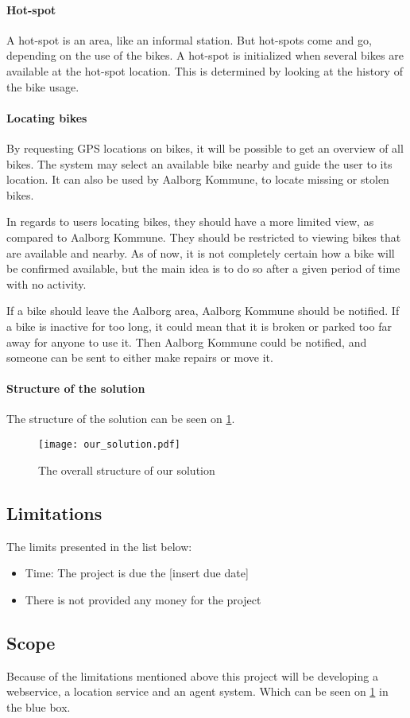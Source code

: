 \paragraph{Hot-spot}
A hot-spot is an area, like an informal station.
But hot-spots come and go, depending on the use of the bikes.
A hot-spot is initialized when several bikes are available at the hot-spot location.
This is determined by looking at the history of the bike usage.

\paragraph{Locating bikes}
By requesting GPS locations on bikes, it will be possible to get an overview of all bikes.
The system may select an available bike nearby and guide the user to its location.
It can also be used by Aalborg Kommune, to locate missing or stolen bikes.

In regards to users locating bikes, they should have a more limited view, as compared to Aalborg Kommune.
They should be restricted to viewing bikes that are available and nearby.
As of now, it is not completely certain how a bike will be confirmed available, but the main idea is to do so after a given period of time with no activity.

If a bike should leave the Aalborg area, Aalborg Kommune should be notified.
If a bike is inactive for too long, it could mean that it is broken or parked too far away for anyone to use it.
Then Aalborg Kommune could be notified, and someone can be sent to either make repairs or move it.

\paragraph{Structure of the solution}
The structure of the solution can be seen on \cref{fig:solution_structure}.

\begin{figure}
\texttt{[image: our\_solution.pdf]}
\caption{The overall structure of our solution}
\label{fig:solution_structure}
\end{figure}

\subsection{Limitations}
The limits presented in the list below:
\begin{itemize}
\item Time: The project is due the [insert due date]
\item There is not provided any money for the project
\end{itemize}

\subsection{Scope}
Because of the limitations mentioned above this project will be developing a webservice, a location service and an agent system.
Which can be seen on \cref{fig:solution_structure} in the blue box.
